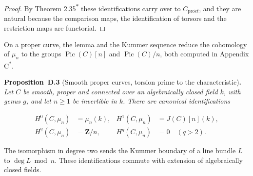 \documentclass[11pt]{article}
\newenvironment{bpstatement}[2]{\par\addvspace{0.6\baselineskip}\noindent\textbf{#1}#2\textbf{.}\enspace\ignorespaces}
  {\par\addvspace{0.4\baselineskip}}
\newenvironment{bpstatementit}[2]{\begin{bpstatement}{#1}{#2}\itshape\ignorespaces}{\end{bpstatement}}
\newcommand{\bpout}[1]{#1\textsuperscript{\hyperlink{bp-outside}{\ensuremath{\ast}}}}
\begin{document}
\begin{proof}[{Proof}]
By Theorem \bpout{2.35} these identifications carry over to \(C_{\mathrm{pro}\acute{e}t}\), and they are natural because the comparison maps, the identification of torsors and the restriction maps are functorial.
\end{proof}

\label{bp9}%
On a proper curve, the lemma and the Kummer sequence reduce the cohomology of \(\mu_n\) to the groups \(\operatorname{Pic}(C)[n]\) and \(\operatorname{Pic}(C)/n\), both computed in Appendix \bpout{C}.

\label{bp10}%
\begin{bpstatementit}{Proposition~D.3}{ (Smooth proper curves, torsion prime to the characteristic)}
Let \(C\) be smooth, proper and connected over an algebraically closed field \(k\), with genus \(g\), and let \(n\geq1\) be invertible in \(k\). There are canonical identifications

\[
\begin{aligned}
H^0(C,\mu_n)&=\mu_n(k),&
H^1(C,\mu_n)&=J(C)[n](k),\\
H^2(C,\mu_n)&=\mathbf Z/n,&
H^q(C,\mu_n)&=0\quad(q>2).
\end{aligned}
\]

The isomorphism in degree two sends the Kummer boundary of a line bundle \(L\) to \(\deg L\bmod n\).  These identifications commute with extension of algebraically closed fields.
\end{bpstatementit}
\end{document}
